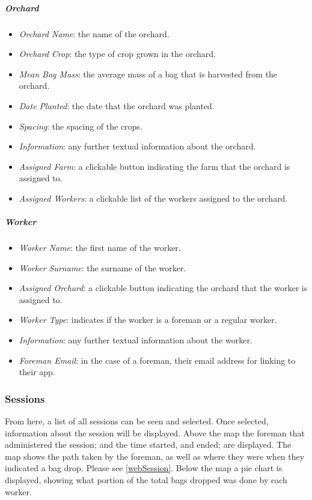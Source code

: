\documentclass[11pt]{article}
\begin{document}
\subparagraph{Orchard}
\begin{itemize}
 \item \textit{Orchard Name}: the name of the orchard.
\item \textit{Orchard Crop}: the type of crop grown in the orchard.
\item \textit{Mean Bag Mass}: the average mass of a bag that is harvested from the orchard.
\item \textit{Date Planted}: the date that the orchard was planted.
\item \textit{Spacing}: the spacing of the crops.
\item \textit{Information}: any further textual information about the orchard.
\item \textit{Assigned Farm}: a clickable button indicating the farm that the orchard is assigned to.
\item \textit{Assigned Workers}: a clickable list of the workers assigned to the orchard.
\end{itemize}

\subparagraph{Worker}
\begin{itemize}
\item \textit{Worker Name}: the first name of the worker.
\item \textit{Worker Surname}: the surname of the worker.
\item \textit{Assigned Orchard}: a clickable button indicating the orchard that the worker is assigned to.
\item \textit{Worker Type}: indicates if the worker is a foreman or a regular worker.
\item \textit{Information}: any further textual information about the worker.
\item \textit{Foreman Email}: in the case of a foreman, their email address for linking to their app.
\end{itemize}
\subsubsection{Sessions}
\label{webSessions}
From here, a list of all sessions can be seen and selected. Once selected, information about the session will be displayed. Above the map the foreman that administered the session; and the time started, and ended; are displayed. The map shows the path taken by the foreman, as well as where they were when they indicated a bag drop. Please see \ref{webSession}. Below the map a pie chart is displayed, showing what portion of the total bags dropped was done by each worker.
\end{document}
